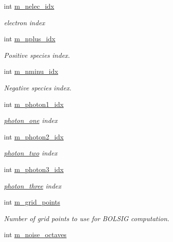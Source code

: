 \begin{DoxyCompactItemize}
int \hyperlink{classair__bolsig_a208346c92fdcdf267fa4762c137de966}{m\+\_\+nelec\+\_\+idx}
\begin{DoxyCompactList}\small\item\em electron index \end{DoxyCompactList}\item 
int \hyperlink{classair__bolsig_a1fa343816af83c384219bafa3e98fc64}{m\+\_\+nplus\+\_\+idx}
\begin{DoxyCompactList}\small\item\em Positive species index. \end{DoxyCompactList}\item 
int \hyperlink{classair__bolsig_a10851faf73043289629c436b63ffd096}{m\+\_\+nminu\+\_\+idx}
\begin{DoxyCompactList}\small\item\em Negative species index. \end{DoxyCompactList}\item 
int \hyperlink{classair__bolsig_a0f58433417a8088841cdbe6401b21c79}{m\+\_\+photon1\+\_\+idx}
\begin{DoxyCompactList}\small\item\em \hyperlink{classair__bolsig_1_1photon__one}{photon\+\_\+one} index \end{DoxyCompactList}\item 
int \hyperlink{classair__bolsig_ab843050b16a5d35962f28b15b50d39a9}{m\+\_\+photon2\+\_\+idx}
\begin{DoxyCompactList}\small\item\em \hyperlink{classair__bolsig_1_1photon__two}{photon\+\_\+two} index \end{DoxyCompactList}\item 
int \hyperlink{classair__bolsig_a985aa63634a9723b9c77d15f9526109c}{m\+\_\+photon3\+\_\+idx}
\begin{DoxyCompactList}\small\item\em \hyperlink{classair__bolsig_1_1photon__three}{photon\+\_\+three} index \end{DoxyCompactList}\item 
int \hyperlink{classair__bolsig_af2afe8417302ebb38b9584b361014160}{m\+\_\+grid\+\_\+points}
\begin{DoxyCompactList}\small\item\em Number of grid points to use for B\+O\+L\+S\+IG computation. \end{DoxyCompactList}\item 
int \hyperlink{classair__bolsig_ae108e137903ffb2d32e20b0060e86f79}{m\+\_\+noise\+\_\+octaves}

\end{DoxyCompactItemize}

